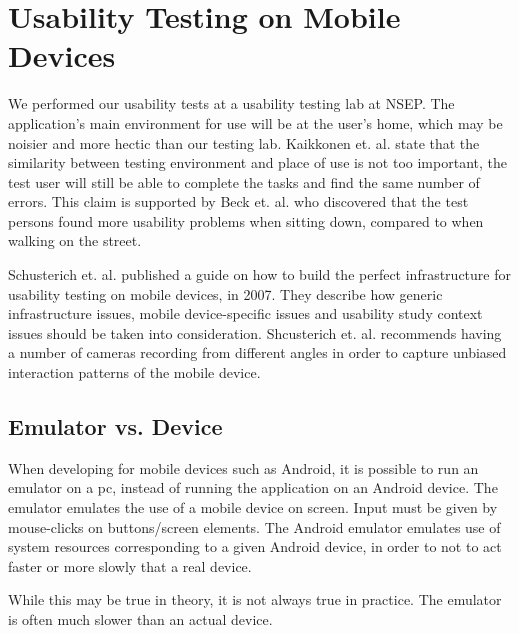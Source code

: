 \section{Usability Testing on Mobile Devices}
\label{sec:usabilitytestonmobiledevices}
We performed our usability tests at a usability testing lab at NSEP. The application's main environment for use will be at the user's home, which may be noisier and more hectic than our testing lab. Kaikkonen et. al. state that the similarity between testing environment and place of use is not too important, the test user will still be able to complete the tasks and find the same number of errors\cite{kallio2005usability}. This claim is supported by Beck et. al. who discovered that the test persons found more usability problems when sitting down, compared to when walking on the street\cite{beck2003experimental}. 

Schusterich et. al.\cite{schusteritsch2007towards} published a guide on how to build the perfect infrastructure for usability testing on mobile devices, in 2007. They describe how generic infrastructure issues, mobile device-specific issues and usability study context issues should be taken into consideration. Shcusterich et. al. recommends having a number of cameras recording from different angles in order to capture unbiased interaction patterns of the mobile device. 

\subsection{Emulator vs. Device}
\label{sec:emulatorvsdevice}
When developing for mobile devices such as Android, it is possible to run an emulator on a pc, instead of running the application on an Android device. The emulator emulates the use of a mobile device on screen. Input must be given by mouse-clicks on buttons/screen elements. The Android emulator emulates use of system resources corresponding to a given Android device, in order to not to act faster or more slowly that a real device. 

While this may be true in theory, it is not always true in practice. The emulator is often much slower than an actual device.


